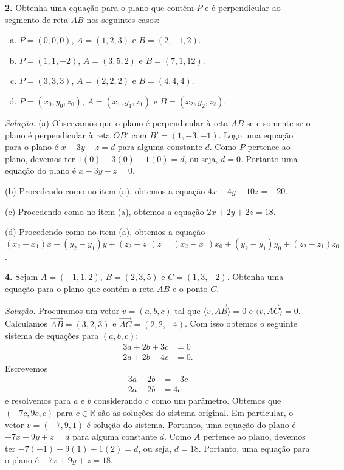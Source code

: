 \documentclass[a4paper,11pt]{article}
\newcommand{\R}{\mathbb{R}}
\begin{document}
\textbf{2.}
Obtenha uma equação para o plano que contém $P$ e é perpendicular ao segmento de reta $AB$ nos seguintes casos:
\begin{enumerate}[(a)]
  \item
    $P = (0,0,0)$, $A = (1,2,3)$ e $B = (2,-1,2)$.
  \item
    $P = (1,1,-2)$, $A = (3,5,2)$ e $B = (7,1,12)$.
  \item
    $P = (3,3,3)$, $A = (2,2,2)$ e $B = (4,4,4)$.
  \item
    $P = (x_0, y_0, z_0)$, $A = (x_1,y_1,z_1)$ e $B = (x_2,y_2,z_2)$.
\end{enumerate}

\vspace{\baselineskip}

\emph{Solução.}
(a)
Observamos que o plano é perpendicular à reta $AB$ se e somente se o plano é perpendicular à reta $OB'$ com $B' = (1,-3,-1)$.
Logo uma equação para o plano é $x - 3y - z = d$ para alguma constante $d$.
Como $P$ pertence ao plano, devemos ter $1(0) - 3(0) -1(0) = d$, ou seja, $d=0$.
Portanto uma equação do plano é $x - 3y - z = 0$.

(b)
Procedendo como no item (a), obtemos a equação $4x - 4y + 10z = -20$.

(c)
Procedendo como no item (a), obtemos a equação $2x + 2y + 2z = 18$.

(d)
Procedendo como no item (a), obtemos a equação $(x_2 - x_1)x + (y_2 - y_1)y + (z_2 - z_1)z = (x_2 - x_1)x_0 + (y_2 - y_1)y_0 + (z_2 - z_1)z_0$.

\vspace{\baselineskip}

\textbf{4.}
Sejam $A = (-1,1,2)$, $B = (2,3,5)$ e $C = (1,3,-2)$.
Obtenha uma equação para o plano que contém a reta $AB$ e o ponto $C$.

\vspace{\baselineskip}

\emph{Solução.}
Procuramos um vetor $v = (a,b,c)$ tal que $\langle v, \overrightarrow{AB} \rangle = 0$ e $\langle v, \overrightarrow{AC} \rangle = 0$.
Calculamos $\overrightarrow{AB} = (3,2,3)$ e $\overrightarrow{AC} = (2,2,-4)$.
Com isso obtemos o seguinte sistema de equações para $(a,b,c)$:
\begin{align*}
  3a + 2b + 3c & = 0 \\
  2a + 2b - 4c & = 0.
\end{align*}
Escrevemos
\begin{align*}
  3a + 2b & = -3c \\
  2a + 2b & = 4c
\end{align*}
e resolvemos para $a$ e $b$ considerando $c$ como um parâmetro.
Obtemos que $(-7c, 9c, c)$ para $c \in \R$ são as soluções do sistema original.
Em particular, o vetor $v = (-7, 9, 1)$ é solução do sistema.
Portanto, uma equação do plano é $-7x + 9y + z = d$ para alguma constante $d$.
Como $A$ pertence ao plano, devemos ter $-7(-1) + 9(1) + 1(2) = d$, ou seja, $d = 18$.
Portanto, uma equação para o plano é $-7x + 9y + z = 18$.
\end{document}
